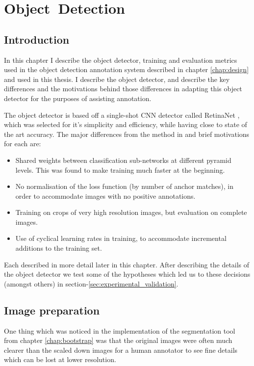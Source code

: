 \chapter{Object~Detection}
\label{chap:object_detection} 

\section{Introduction}

In this chapter I describe the object detector, training and evaluation metrics used in the object detection annotation system described in chapter \ref{chap:design} and used in this thesis. I describe the object detector, and describe the key differences and the motivations behind those differences in adapting this object detector for the purposes of assisting annotation.

The object detector is based off a single-shot \gls{CNN} detector called RetinaNet \cite{Lin2017}, which was selected for it's simplicity and efficiency, while having close to state of the art accuracy. The major differences from the method in \cite{Lin2017} and brief motivations for each are:

\begin{itemize}
    \item Shared weights between classification sub-networks at different pyramid levels. This was found to make training much faster at the beginning.
    \item No normalisation of the loss function (by number of anchor matches), in order to accommodate images with no positive annotations.
    \item Training on crops of very high resolution images, but evaluation on complete images.
    \item Use of cyclical learning rates in training, to accommodate incremental additions to the training set.
\end{itemize}

Each described in more detail later in this chapter. After describing the details of the object detector we test some of the hypotheses which led us to these decisions (amongst others) in section-\ref{sec:experimental_validation}.

\section {Image preparation}

One thing which was noticed in the implementation of the segmentation tool from chapter \ref{chap:bootstrap} was that the original images were often much clearer than the scaled down images for a human annotator to see fine details which can be lost at lower resolution. 

